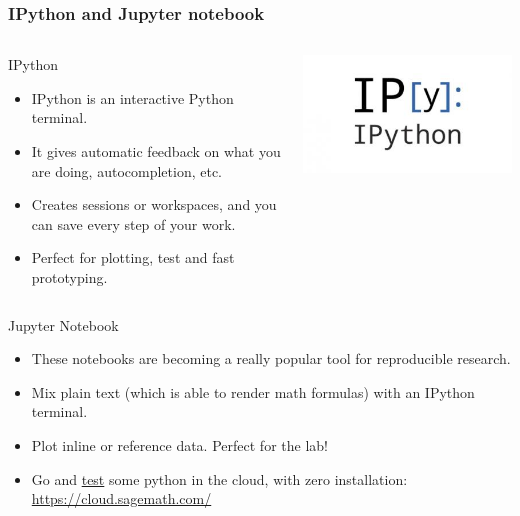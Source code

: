 \documentclass[9pt]{beamer}
\begin{document}
\begin{frame}
  \frametitle{IPython and Jupyter notebook}
  \begin{columns}[onlytextwidth]
    \begin{exampleblock}{IPython}
      \begin{itemize}
        \item IPython is an interactive Python terminal.
        \item It gives automatic feedback on what you are doing, autocompletion, etc.
        \item Creates sessions or workspaces, and you can save every step of your work.
        \item Perfect for plotting, test and fast prototyping.
      \end{itemize}
    \end{exampleblock}
      \includegraphics[width=0.9\linewidth]{./Figures/software_logos/ipythonLogo.jpg}
  \end{columns}
  \begin{columns}[onlytextwidth]
    \begin{exampleblock}{Jupyter Notebook}
      \begin{itemize}
        \item These notebooks are becoming a really popular tool for reproducible research.
        \item Mix plain text (which is able to render math formulas) with an IPython terminal.
        \item Plot inline or reference data. Perfect for the lab!
        \item Go and \href{https://cloud.sagemath.com/projects/403cb56d-6912-414f-8bec-2226217121a3/files/2017-02-24-080200.ipyn}{test} some python in the cloud, with zero installation: \url{https://cloud.sagemath.com/}

\end{itemize}
\end{exampleblock}
\end{columns}
\end{frame}
\end{document}
